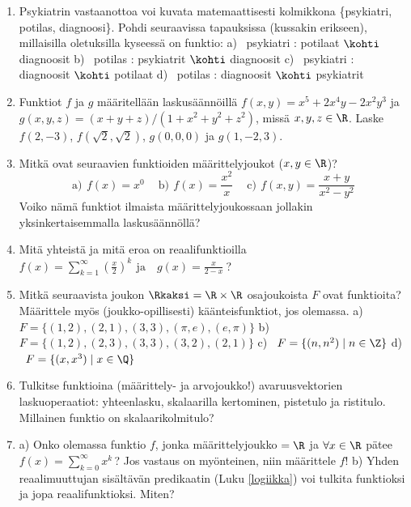 \Harj
\begin{enumerate}

\item
Psykiatrin vastaanottoa voi kuvata matemaattisesti kolmikkona \{psykiatri,
potilas, diagnoosi\}. Pohdi seuraavissa tapauksissa (kussakin erikseen), millaisilla oletuksilla
kyseessä on funktio: \newline
a) \ psykiatri : potilaat $\kohti$ diagnoosit \newline
b) \ potilas  :  psykiatrit $\kohti$ diagnoosit \newline
c) \ psykiatri : diagnoosit $\kohti$ potilaat \newline
d) \ potilas : diagnoosit $\kohti$ psykiatrit

\item
Funktiot $f$ ja $g$ määritellään laskusäännöillä $f(x,y)=x^5+2x^4y-2x^2y^3$ ja
$g(x,y,z)=(x+y+z)/(1+x^2+y^2+z^2)$, missä $x,y,z\in\R$. Laske $f(2,-3)$, $f(\sqrt{2},\sqrt{2})$,
$g(0,0,0)$ ja $g(1,-2,3)$. 

\item 
Mitkä ovat seuraavien funktioiden määrittelyjoukot ($x,y\in\R$)? 
\[
\text{a)}\,\ f(x)=x^{0} \quad\ \text{b)}\,\ f(x)=\frac{x^2}{x} \quad\ 
\text{c)}\,\ f(x,y)=\frac{x+y}{x^2-y^2}
\]
Voiko nämä funktiot ilmaista määrittelyjoukossaan jollakin yksinkertaisemmalla laskusäännöllä?

\item
Mitä yhteistä ja mitä eroa on reaalifunktioilla \newline
$\displaystyle{f(x)=\sum_{k=1}^\infty \left(\frac{x}{2}\right)^k\,\ \text{ja} \quad
               g(x)=\frac{x}{2-x}\ }$?

\item
Mitkä seuraavista joukon $\Rkaksi=\R\times\R$ osajoukoista $F$ ovat funktioita? Määrittele myös 
(joukko-opillisesti) käänteisfunktiot, jos olemassa. \newline
a) \ $F=\{(1,2),(2,1),(3,3),(\pi,e),(e,\pi)\}$ \newline
b) \ $F=\{(1,2),(2,3),(3,3),(3,2),(2,1)\}$ \newline
c) \ $F=\{(n,n^2) \mid n\in\Z\}$ \newline
d) \ $F=\{(x,x^3) \mid x\in\Q\}$

\item
Tulkitse funktioina (määrittely- ja arvojoukko!) avaruusvektorien laskuoperaatiot: yhteenlasku,
skalaarilla kertominen, pistetulo ja ristitulo. Millainen funktio on skalaarikolmitulo?
 
\item
a) Onko olemassa funktio $f$, jonka määrittelyjoukko $=\R$ ja $\forall x\in\R$ pätee
$f(x)=\sum_{k=0}^\infty x^k$\,? Jos vastaus on myönteinen, niin määrittele $f$! \newline 
b) Yhden reaalimuuttujan sisältävän predikaatin (Luku \ref{logiikka}) voi tulkita funktioksi
ja jopa reaalifunktioksi. Miten?


\end{enumerate}
